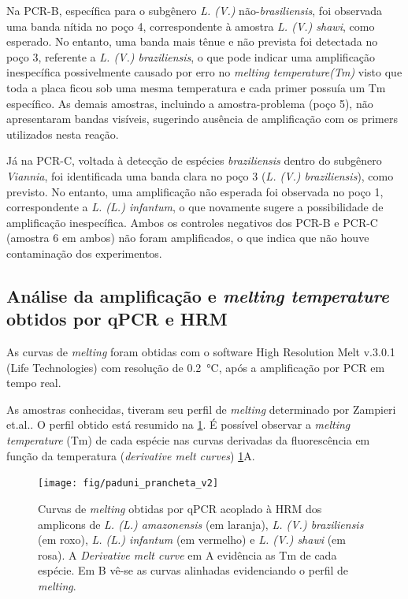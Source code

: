 
Na PCR-B, específica para o subgênero \textit{L. (V.)}
não-\textit{brasiliensis}, foi observada uma banda nítida no poço 4,
correspondente à amostra \textit{L. (V.) shawi}, como esperado.  No entanto, uma
banda mais tênue e não prevista foi detectada no poço 3, referente a \textit{L.
(V.) braziliensis}, o que pode indicar uma amplificação inespecífica
possivelmente causado por erro no \textit{melting temperature(Tm)} visto que
toda a placa ficou sob uma mesma temperatura e cada primer possuía um Tm
específico. As demais amostras, incluindo a amostra-problema (poço 5), não
apresentaram bandas visíveis, sugerindo ausência de amplificação com os primers
utilizados nesta reação.

Já na PCR-C, voltada à detecção de espécies \textit{braziliensis} dentro do
subgênero \textit{Viannia}, foi identificada uma banda clara no poço 3 (\textit{L. (V.) braziliensis}), 
como previsto. No entanto, uma amplificação não esperada foi observada no poço 1, correspondente a \textit{L. (L.) infantum},  o que novamente sugere a possibilidade de amplificação inespecífica.
Ambos os controles negativos dos PCR-B e PCR-C (amostra 6 em ambos) não foram amplificados, o que indica que não houve contaminação dos experimentos.

\subsection{Análise da amplificação e \textit{melting temperature} obtidos por
qPCR e HRM}

As curvas de \textit{melting} foram obtidas com o software High
Resolution Melt v.3.0.1 (Life Technologies) com resolução de
\qty{0,2}{\celsius}, após a amplificação por PCR em tempo real.

As amostras conhecidas, tiveram seu perfil de \textit{melting} determinado por
Zampieri et.al.\cite{HRMzampi2016}. O perfil obtido está resumido na
\cref{paduni}.  É possível observar a \textit{melting temperature} (Tm) de cada
espécie nas curvas derivadas da fluorescência em função da temperatura
(\textit{derivative melt curves}) \cref{paduni}A.

\begin{figure}[h]
        \centering
        \texttt{[image: fig/paduni\_prancheta\_v2]}
        \caption{Curvas de \textit{melting} obtidas por qPCR acoplado à HRM dos amplicons de \textit{L. (L.)
        amazonensis} (em laranja), \textit{L. (V.) braziliensis} (em roxo),
    \textit{L. (L.) infantum} (em vermelho) e \textit{L. (V.) shawi} (em rosa).
A \textit{Derivative melt curve} em A evidência as Tm de cada espécie. Em B
vê-se as curvas alinhadas evidenciando o perfil de \textit{melting}.}
        \label{paduni}
\end{figure} 

